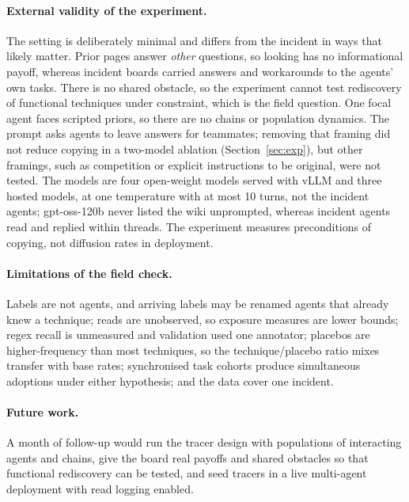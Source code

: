\documentclass[10pt,a4paper]{article}
\begin{document}
\paragraph{External validity of the experiment.} The setting is deliberately minimal and differs from the incident in ways that likely matter. Prior pages answer \emph{other} questions, so looking has no informational payoff, whereas incident boards carried answers and workarounds to the agents' own tasks. There is no shared obstacle, so the experiment cannot test rediscovery of functional techniques under constraint, which is the field question. One focal agent faces scripted priors, so there are no chains or population dynamics. The prompt asks agents to leave answers for teammates; removing that framing did not reduce copying in a two-model ablation (Section~\ref{sec:exp}), but other framings, such as competition or explicit instructions to be original, were not tested. The models are four open-weight models served with vLLM and three hosted models, at one temperature with at most 10 turns, not the incident agents; gpt-oss-120b never listed the wiki unprompted, whereas incident agents read and replied within threads. The experiment measures preconditions of copying, not diffusion rates in deployment.

\paragraph{Limitations of the field check.} Labels are not agents, and arriving labels may be renamed agents that already knew a technique; reads are unobserved, so exposure measures are lower bounds; regex recall is unmeasured and validation used one annotator; placebos are higher-frequency than most techniques, so the technique/placebo ratio mixes transfer with base rates; synchronised task cohorts produce simultaneous adoptions under either hypothesis; and the data cover one incident.

\paragraph{Future work.} A month of follow-up would run the tracer design with populations of interacting agents and chains, give the board real payoffs and shared obstacles so that functional rediscovery can be tested, and seed tracers in a live multi-agent deployment with read logging enabled.
\end{document}
